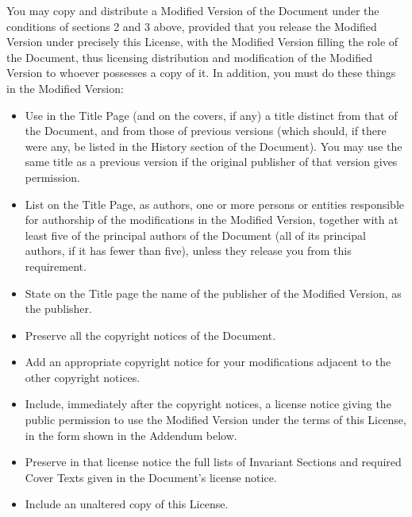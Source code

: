 You may copy and distribute a Modified Version of the Document under
the conditions of sections 2 and 3 above, provided that you release
the Modified Version under precisely this License, with the Modified
Version filling the role of the Document, thus licensing distribution
and modification of the Modified Version to whoever possesses a copy
of it.  In addition, you must do these things in the Modified Version:

\begin{itemize}
    \item[A.]
          Use in the Title Page (and on the covers, if any) a title distinct
          from that of the Document, and from those of previous versions
          (which should, if there were any, be listed in the History section
          of the Document).  You may use the same title as a previous version
          if the original publisher of that version gives permission.

    \item[B.]
          List on the Title Page, as authors, one or more persons or entities
          responsible for authorship of the modifications in the Modified
          Version, together with at least five of the principal authors of the
          Document (all of its principal authors, if it has fewer than five),
          unless they release you from this requirement.

    \item[C.]
          State on the Title page the name of the publisher of the
          Modified Version, as the publisher.

    \item[D.]
          Preserve all the copyright notices of the Document.

    \item[E.]
          Add an appropriate copyright notice for your modifications
          adjacent to the other copyright notices.

    \item[F.]
          Include, immediately after the copyright notices, a license notice
          giving the public permission to use the Modified Version under the
          terms of this License, in the form shown in the Addendum below.

    \item[G.]
          Preserve in that license notice the full lists of Invariant Sections
          and required Cover Texts given in the Document's license notice.

    \item[H.]
          Include an unaltered copy of this License.


\end{itemize}
